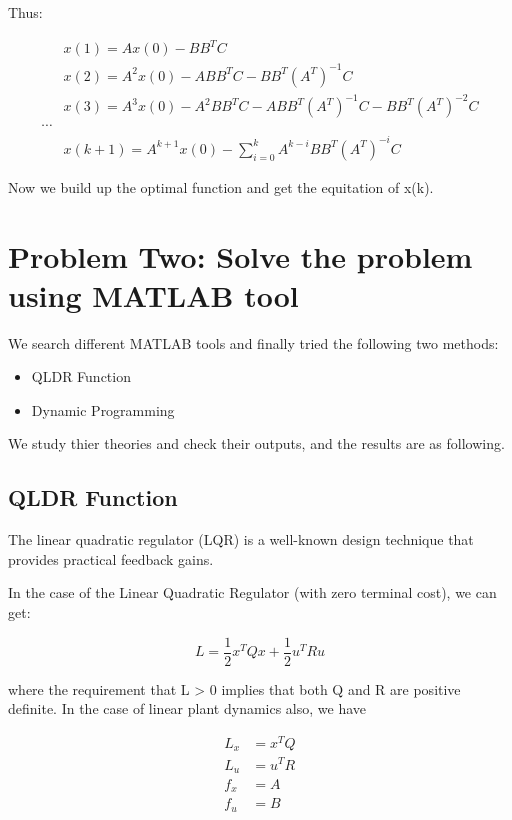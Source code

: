 \documentclass{mcmthesis}
\begin{document}
Thus:

\begin{align}
&x(1)=A x(0)-B B^{T} C \\
&x(2)=A^{2} x(0)-A B B^{T} C-B B^{T}\left(A^{T}\right)^{-1} C \\
&x(3)=A^{3} x(0)-A^{2} B B^{T} C-A B B^{T}\left(A^{T}\right)^{-1} C-B B^{T}\left(A^{T}\right)^{-2} C \\
\cdots \\
& x(k+1)=A^{k+1} x(0)-\sum_{i=0}^{k} A^{k-i} B B^{T}\left(A^{T}\right)^{-i} C
\end{align}

Now we build up the optimal function and get the equitation of x(k).
\section{Problem Two: Solve the problem using MATLAB tool}

We search different MATLAB tools and finally tried the following two methods:

\begin{itemize}

\item QLDR Function
\item Dynamic Programming 

\end{itemize}

We study thier theories and check their outputs, and the results are as following.
\subsection{QLDR Function}

The linear quadratic regulator (LQR) is a well-known design technique that provides practical feedback gains.

In the case of the Linear Quadratic Regulator (with zero terminal cost), we can get:

$$L=\frac{1}{2} x^{T} Q x+\frac{1}{2} u^{T} R u$$

where the requirement that L > 0 implies that both Q and R are positive definite. In the
case of linear plant dynamics also, we have


$$\begin{aligned}
L_{x} &=x^{T} Q \\
L_{u} &=u^{T} R \\
f_{x} &=A \\
f_{u} &=B
\end{aligned}$$
\end{document}
